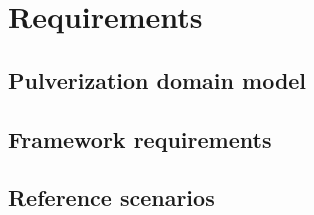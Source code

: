 \chapter{Requirements}
\label{chap:requirements}

\section{Pulverization domain model}
\label{sec:pulverization-domain-model}


\section{Framework requirements}
\label{sec:framework-requirements}


\section{Reference scenarios}
\label{sec:reference-scenarios}
